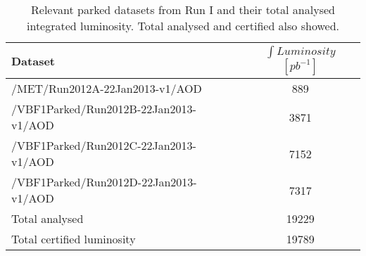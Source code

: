 \begin{table}[!htb]
\centering
\begin{tabular}{|l|c|}
\hline
Dataset & $\int{Luminosity}$ $[pb^{-1}]$ \\
\hline \hline
/MET/Run2012A-22Jan2013-v1/AOD & 889 \\
/VBF1Parked/Run2012B-22Jan2013-v1/AOD & 3871 \\
/VBF1Parked/Run2012C-22Jan2013-v1/AOD & 7152 \\
/VBF1Parked/Run2012D-22Jan2013-v1/AOD & 7317 \\
\hline
Total analysed & 19229 \\
\hline \hline
Total certified luminosity & 19789 \\
\hline
\end{tabular}
\caption{Relevant parked datasets from Run I and their total analysed integrated luminosity. Total analysed and certified also showed.}
\label{TABLE:ParkedData_Data_RunI_IntegratedLuminosity}
\end{table}
